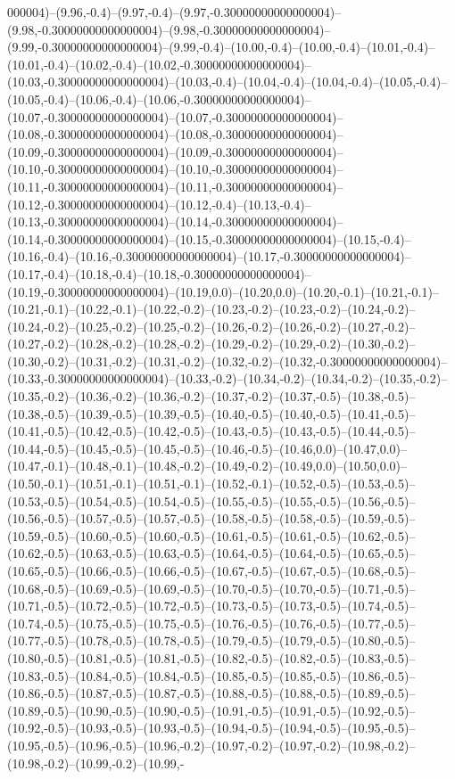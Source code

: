 000004)--(9.96,-0.4)--(9.97,-0.4)--(9.97,-0.30000000000000004)--(9.98,-0.30000000000000004)--(9.98,-0.30000000000000004)--(9.99,-0.30000000000000004)--(9.99,-0.4)--(10.00,-0.4)--(10.00,-0.4)--(10.01,-0.4)--(10.01,-0.4)--(10.02,-0.4)--(10.02,-0.30000000000000004)--(10.03,-0.30000000000000004)--(10.03,-0.4)--(10.04,-0.4)--(10.04,-0.4)--(10.05,-0.4)--(10.05,-0.4)--(10.06,-0.4)--(10.06,-0.30000000000000004)--(10.07,-0.30000000000000004)--(10.07,-0.30000000000000004)--(10.08,-0.30000000000000004)--(10.08,-0.30000000000000004)--(10.09,-0.30000000000000004)--(10.09,-0.30000000000000004)--(10.10,-0.30000000000000004)--(10.10,-0.30000000000000004)--(10.11,-0.30000000000000004)--(10.11,-0.30000000000000004)--(10.12,-0.30000000000000004)--(10.12,-0.4)--(10.13,-0.4)--(10.13,-0.30000000000000004)--(10.14,-0.30000000000000004)--(10.14,-0.30000000000000004)--(10.15,-0.30000000000000004)--(10.15,-0.4)--(10.16,-0.4)--(10.16,-0.30000000000000004)--(10.17,-0.30000000000000004)--(10.17,-0.4)--(10.18,-0.4)--(10.18,-0.30000000000000004)--(10.19,-0.30000000000000004)--(10.19,0.0)--(10.20,0.0)--(10.20,-0.1)--(10.21,-0.1)--(10.21,-0.1)--(10.22,-0.1)--(10.22,-0.2)--(10.23,-0.2)--(10.23,-0.2)--(10.24,-0.2)--(10.24,-0.2)--(10.25,-0.2)--(10.25,-0.2)--(10.26,-0.2)--(10.26,-0.2)--(10.27,-0.2)--(10.27,-0.2)--(10.28,-0.2)--(10.28,-0.2)--(10.29,-0.2)--(10.29,-0.2)--(10.30,-0.2)--(10.30,-0.2)--(10.31,-0.2)--(10.31,-0.2)--(10.32,-0.2)--(10.32,-0.30000000000000004)--(10.33,-0.30000000000000004)--(10.33,-0.2)--(10.34,-0.2)--(10.34,-0.2)--(10.35,-0.2)--(10.35,-0.2)--(10.36,-0.2)--(10.36,-0.2)--(10.37,-0.2)--(10.37,-0.5)--(10.38,-0.5)--(10.38,-0.5)--(10.39,-0.5)--(10.39,-0.5)--(10.40,-0.5)--(10.40,-0.5)--(10.41,-0.5)--(10.41,-0.5)--(10.42,-0.5)--(10.42,-0.5)--(10.43,-0.5)--(10.43,-0.5)--(10.44,-0.5)--(10.44,-0.5)--(10.45,-0.5)--(10.45,-0.5)--(10.46,-0.5)--(10.46,0.0)--(10.47,0.0)--(10.47,-0.1)--(10.48,-0.1)--(10.48,-0.2)--(10.49,-0.2)--(10.49,0.0)--(10.50,0.0)--(10.50,-0.1)--(10.51,-0.1)--(10.51,-0.1)--(10.52,-0.1)--(10.52,-0.5)--(10.53,-0.5)--(10.53,-0.5)--(10.54,-0.5)--(10.54,-0.5)--(10.55,-0.5)--(10.55,-0.5)--(10.56,-0.5)--(10.56,-0.5)--(10.57,-0.5)--(10.57,-0.5)--(10.58,-0.5)--(10.58,-0.5)--(10.59,-0.5)--(10.59,-0.5)--(10.60,-0.5)--(10.60,-0.5)--(10.61,-0.5)--(10.61,-0.5)--(10.62,-0.5)--(10.62,-0.5)--(10.63,-0.5)--(10.63,-0.5)--(10.64,-0.5)--(10.64,-0.5)--(10.65,-0.5)--(10.65,-0.5)--(10.66,-0.5)--(10.66,-0.5)--(10.67,-0.5)--(10.67,-0.5)--(10.68,-0.5)--(10.68,-0.5)--(10.69,-0.5)--(10.69,-0.5)--(10.70,-0.5)--(10.70,-0.5)--(10.71,-0.5)--(10.71,-0.5)--(10.72,-0.5)--(10.72,-0.5)--(10.73,-0.5)--(10.73,-0.5)--(10.74,-0.5)--(10.74,-0.5)--(10.75,-0.5)--(10.75,-0.5)--(10.76,-0.5)--(10.76,-0.5)--(10.77,-0.5)--(10.77,-0.5)--(10.78,-0.5)--(10.78,-0.5)--(10.79,-0.5)--(10.79,-0.5)--(10.80,-0.5)--(10.80,-0.5)--(10.81,-0.5)--(10.81,-0.5)--(10.82,-0.5)--(10.82,-0.5)--(10.83,-0.5)--(10.83,-0.5)--(10.84,-0.5)--(10.84,-0.5)--(10.85,-0.5)--(10.85,-0.5)--(10.86,-0.5)--(10.86,-0.5)--(10.87,-0.5)--(10.87,-0.5)--(10.88,-0.5)--(10.88,-0.5)--(10.89,-0.5)--(10.89,-0.5)--(10.90,-0.5)--(10.90,-0.5)--(10.91,-0.5)--(10.91,-0.5)--(10.92,-0.5)--(10.92,-0.5)--(10.93,-0.5)--(10.93,-0.5)--(10.94,-0.5)--(10.94,-0.5)--(10.95,-0.5)--(10.95,-0.5)--(10.96,-0.5)--(10.96,-0.2)--(10.97,-0.2)--(10.97,-0.2)--(10.98,-0.2)--(10.98,-0.2)--(10.99,-0.2)--(10.99,-